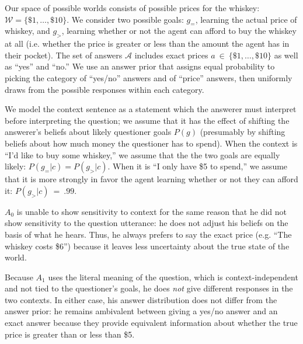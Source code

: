 \documentclass[11pt, floatsintext]{apa6}
\begin{document}
Our space of possible worlds consists of possible prices for the whiskey: $\mathcal{W} = \{\$1, \dots, \$10\}$. We consider two possible goals: $g_=$, learning the actual price of whiskey,  and $g_>$, learning whether or not the agent can afford to buy the whiskey at all (i.e. whether the price is greater or less than the amount the agent has in their pocket). The set of answers $\mathcal{A}$ includes exact prices $a~\in~\{\$1, \dots, \$10\}$ as well as ``yes'' and ``no.'' 
We use an answer prior that assigns equal probability to picking the category of ``yes/no'' answers and of ``price'' answers, then uniformly draws from the possible responses within each category. 


We model the context sentence as a statement which the answerer must interpret before interpreting the question; we assume that it has the effect of shifting the answerer's beliefs about likely questioner goals $P(g)$ (presumably by shifting beliefs about how much money the questioner has to spend). When the context is ``I'd like to buy some whiskey,'' we assume that the the two goals are equally likely: $P(g_= | c) = P(g_> | c)$. When it is ``I only have \$5 to spend,'' we assume that it is more strongly in favor the agent learning whether or not they can afford it: $P(g_> | c)~=~.99$. 

$A_0$ is unable to show sensitivity to context for the same reason that he did not show sensitivity to the question utterance: he does not adjust his beliefs on the basis of what he hears. Thus, he always prefers to say the exact price (e.g. ``The whiskey costs \$6'') because it leaves less uncertainty about the true state of the world.

Because $A_1$ uses the literal meaning of the question, which is context-independent and not tied to the questioner's goals, he does \emph{not} give different responses in the two contexts. 
In either case, his answer distribution does not differ from the answer prior: he remains ambivalent between giving a yes/no answer and an exact answer because they provide equivalent information about whether the true price is greater than or less than \$5. 
\end{document}
